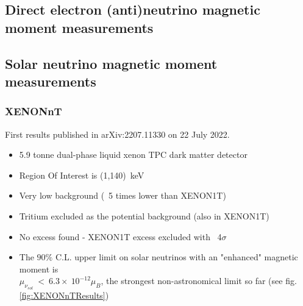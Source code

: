 \subsection{Direct electron (anti)neutrino magnetic moment measurements}

\subsection{Solar neutrino magnetic moment measurements}
\subsubsection{XENONnT}
First results published in arXiv:2207.11330\cite{XENONnTFirstResults2022_OfficialPaper.pdf} on 22 July 2022.
\begin{itemize}
    \item 5.9 tonne dual-phase liquid xenon TPC dark matter detector
    \item Region Of Interest is (1,140)~keV
    \item Very low background (~5 times lower than XENON1T)
    \item Tritium excluded as the potential background (also in XENON1T)
    \item No excess found - XENON1T excess excluded with ~4$\sigma$
    \item The $90\%$ C.L. upper limit on solar neutrinos with an "enhanced" magnetic moment is \\$\mu_{\nu_{sol}}~<~6.3\times~10^{-12}\mu_B$, the strongest non-astronomical limit so far (see fig.\ref{fig:XENONnTResults})
\end{itemize}

